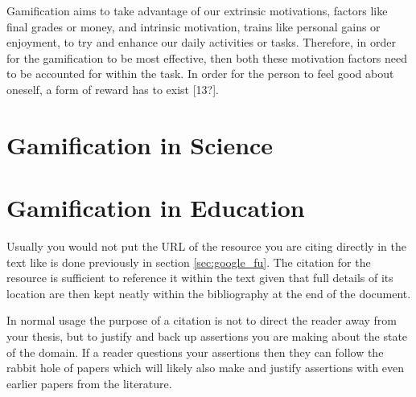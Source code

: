 		Gamification aims to take advantage of our extrinsic motivations, factors like final grades or money, and intrinsic motivation, trains like personal gains or enjoyment, to try and enhance our daily activities or tasks. Therefore, in order for the gamification to be most effective, then both these motivation factors need to be accounted for within the task. In order for the person to feel good about oneself, a form of reward has to exist [13?].
		
		
		
			
	\section{Gamification in Science}
		\label{sec:resources_bibtex}
	
		
	\section{Gamification in Education}
		\label{sec:gamification_edu}
		Usually you would not put the URL of the resource you are citing directly in the text like is done previously in section \ref{sec:google_fu}. The citation for the resource \cite{gwern} is sufficient to reference it within the text given that full details of its location are then kept neatly within the bibliography at the end of the document. 
		
		In normal usage the purpose of a citation is not to direct the reader away from your thesis, but to justify and back up assertions you are making about the state of the domain. If a reader questions your assertions then they can follow the rabbit hole of papers which will likely also make and justify assertions with even earlier papers from the literature. 
		
